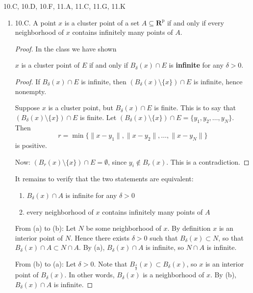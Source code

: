 
10.C, 10.D, 10.F, 11.A, 11.C, 11.G, 11.K

\begin{enumerate}
	\item 10.C. A point $x$ is a cluster point of a set $A \subseteq \boldsymbol{R}^{\mathrm{p}}$ if and only if every neighborhood of $x$ contains infinitely many points of $A$.
\begin{proof}
	In the class we have shown
\begin{proposition}
	$x$ is a cluster point of $E$ if and only if $B_{\delta}(x) \cap E$ is \textbf{infinite} for any  $\delta>0$.
\end{proposition}
\begin{proof}
	If $B_\delta(x) \cap E$ is infinite, then $ (B_{\delta}(x) \setminus \{x\} ) \cap E$ is infinite, hence nonempty.

	Suppose $x$ is a cluster point, but $B_{\delta}(x)  \cap E$ is finite. This is to say that $(B_{\delta}(x) \setminus \{x\} ) \cap E$ is finite. 
	Let $(B_{\delta}(x) \setminus \{x\} ) \cap E = \{ y_1,y_2,\ldots,y_N\}$. Then \[
		r = \min \{\|x-y_1\|, \|x-y_2\|,\ldots,\|x-y_N\|\}
	\]
	is positive.
	
	Now:  
	$(B_{r}(x) \setminus \{x\} ) \cap E = \emptyset $, since $y_i \not\in B_r(x)$. This is a contradiction.
\end{proof}

It remains to verify that the two statements are equivalent:
\begin{enumerate}
	\item $B_{\delta}(x) \cap A$ is infinite for any  $\delta>0$
	\item every neighborhood of $x$ contains infinitely many points of $A$
\end{enumerate}
From (a) to (b): 
Let $N$ be some neighborhood of $x$. By definition $x$ is an interior point of $N$. Hence there exists $\delta>0$ such that $B_\delta(x) \subset N$, so that $B_\delta(x) \cap A \subset N \cap A$. By (a),  $B_\delta(x) \cap A$ is infinite, so $N \cap A$ is infinite.

From (b) to (a):
Let $\delta>0$. Note that $B_{\frac{\delta}{2}}(x) \subset B_\delta(x)$, so $x$ is an interior point of $B_\delta(x)$. In other words, $B_\delta(x)$ is a neighborhood of $x$. By (b), $B_\delta(x) \cap A$ is infinite.
\end{proof}


\end{enumerate}
